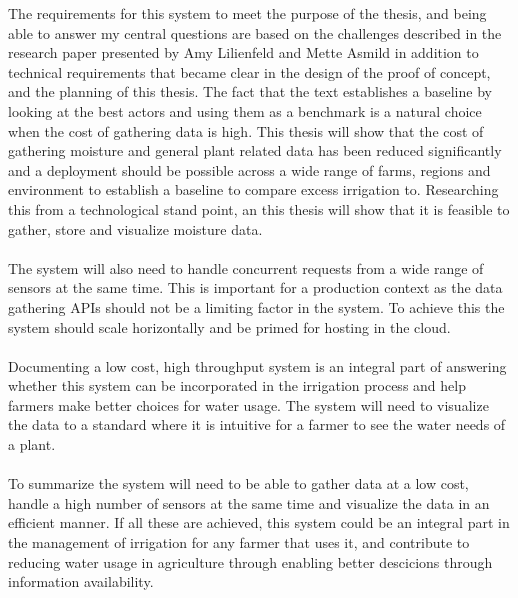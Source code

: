 \documentclass[]{uiophd}
\begin{document}
The requirements for this system to meet the purpose of the thesis, and being able to answer my central questions are based on the challenges described in the research paper presented by Amy Lilienfeld and Mette Asmild in addition to technical requirements that became clear in the design of the proof of concept, and the planning of this thesis. The fact that the text establishes a baseline by looking at the best actors and using them as a benchmark is a natural choice when the cost of gathering data is high. This thesis will show that the cost of gathering moisture and general plant related data has been reduced significantly and a deployment should be possible across a wide range of farms, regions and environment to establish a baseline to compare excess irrigation to. Researching this from a technological stand point, an this thesis will show that it is feasible to gather, store and visualize moisture data.
\\\\
The system will also need to handle concurrent requests from a wide range of sensors at the same time. This is important for a production context as the data gathering APIs should not be a limiting factor in the system. To achieve this the system should scale horizontally and be primed for hosting in the cloud.
\\\\
Documenting a low cost, high throughput system is an integral part of answering whether this system can be incorporated in the irrigation process and help farmers make better choices for water usage. The system will need to visualize the data to a standard where it is intuitive for a farmer to see the water needs of a plant.
\\\\
To summarize the system will need to be able to gather data at a low cost, handle a high number of sensors at the same time and visualize the data in an efficient manner. If all these are achieved, this system could be an integral part in the management of irrigation for any farmer that uses it, and contribute to reducing water usage in agriculture through enabling better descicions through information availability.
\end{document}
